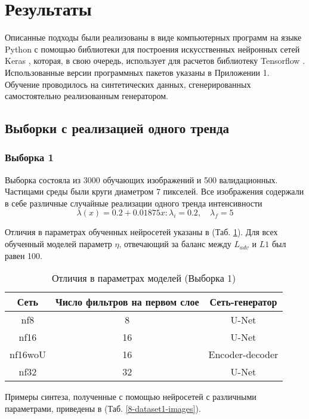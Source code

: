 \clearpage
\section{Результаты}
	Описанные подходы были реализованы в виде компьютерных программ на языке Python с помощью библиотеки для построения искусственных нейронных сетей Keras \cite{keras}, которая, в свою очередь, использует для расчетов библиотеку Tensorflow \cite{tf}. Использованные версии программных пакетов указаны в Приложении 1. Обучение проводилось на синтетических данных, сгенерированных самостоятельно реализованным генератором. 
	\subsection{Выборки с реализацией одного тренда}
		\subsubsection{Выборка 1}
			Выборка состояла из 3000 обучающих изображений и 500 валидационных. Частицами среды были круги диаметром 7 пикселей. Все изображения содержали в себе различные случайные реализации одного тренда интенсивности
			$$\lambda(x) = 0.2 + 0.01875x : \lambda_i = 0.2, \quad \lambda_f = 5$$
			
			Отличия в параметрах обученных нейросетей указаны в (Таб. \ref{8-sand-trend2-nns}). Для всех обученный моделей параметр $\eta$, отвечающий за баланс между $L_{adv}$ и $L1$ был равен 100.
			
			\begin{table}[h!]
				\begin{center}
					\begin{tabular}{|c|c|c|}
						\hline
						Сеть & Число фильтров на первом слое & Сеть-генератор \\
						\hline
						nf8 & 8 & U-Net \\
						\hline
						nf16 & 16 & U-Net \\
						\hline
						nf16woU & 16 & Encoder-decoder \\
						\hline
						nf32 & 32 & U-Net \\
						\hline
					\end{tabular}
					\caption{Отличия в параметрах моделей (Выборка 1)}
					\label{8-sand-trend2-nns}
				\end{center}
			\end{table}
			
			Примеры синтеза, полученные с помощью нейросетей с различными параметрами, приведены в (Таб. \ref{8-dataset1-images}).
			
